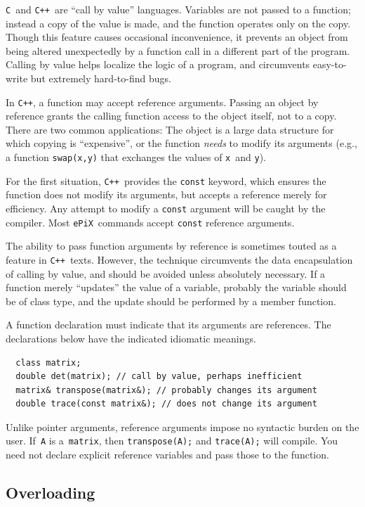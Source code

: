 \documentclass[12pt,letterpaper]{book}
\newcommand{\code}[1]{\texttt{#1}}
\newcommand{\ePiX}{\code{ePiX}}
\newcommand{\CXX}{\code{C++}}
\begin{document}
\label{references}
\code{C}~and \CXX\ are ``call by value'' languages. Variables are not
passed to a function; instead a copy of the value is made, and the
function operates only on the copy. Though this feature causes
occasional inconvenience, it prevents an object from being altered
unexpectedly by a function call in a different part of the program.
Calling by value helps localize the logic of a program, and
circumvents easy-to-write but extremely hard-to-find bugs.

In \CXX, a function may accept reference arguments. Passing an object
by reference grants the calling function access to the object itself,
not to a copy. There are two common applications: The object is a
large data structure for which copying is ``expensive'', or the
function \emph{needs} to modify its arguments (e.g., a function
\code{swap(x,y)} that exchanges the values of \code{x}~and
\code{y}). 

For the first situation, \CXX\ provides the \code{const} keyword,
which ensures the function does not modify its arguments, but accepts
a reference merely for efficiency. Any attempt to modify a
\code{const} argument will be caught by the compiler. Most \ePiX\
commands accept \code{const} reference arguments.

The ability to pass function arguments by reference is sometimes
touted as a feature in \CXX\ texts. However, the technique circumvents
the data encapsulation of calling by value, and should be avoided
unless absolutely necessary. If a function merely ``updates'' the
value of a variable, probably the variable should be of class type,
and the update should be performed by a member function.

A function declaration must indicate that its arguments are
references. The declarations below have the indicated idiomatic
meanings.
\begin{verbatim}
  class matrix;
  double det(matrix); // call by value, perhaps inefficient
  matrix& transpose(matrix&); // probably changes its argument
  double trace(const matrix&); // does not change its argument
\end{verbatim}
Unlike pointer arguments, reference arguments impose no syntactic
burden on the user. If~\code{A} is a~\code{matrix}, then
\code{transpose(A);} and \code{trace(A);} will compile. You need not
declare explicit reference variables and pass those to the function.


\subsection{Overloading}
\end{document}
